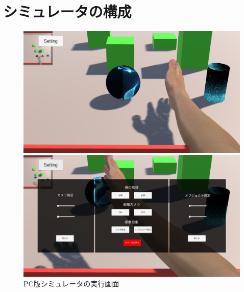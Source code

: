 \documentclass{ltjsreport}
\begin{document}
	

	\section{シミュレータの構成}

		\begin{figure}[H]
		\centering
		\begin{minipage}{0.75\columnwidth}
		\centering
		\includegraphics[width = \columnwidth]{../figs/PCnomal.png}
		\end{minipage}
		\hspace{0.04\columnwidth}
		\begin{minipage}{0.75\columnwidth}
		\centering
		\includegraphics[width = \columnwidth]{../figs/PCmenu.png}
		\end{minipage}
		\caption{PC版シミュレータの実行画面}
		\end{figure}
\end{document}
